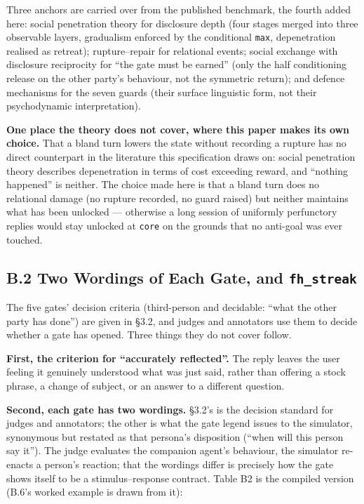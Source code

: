 \documentclass[letterpaper]{article}
\begin{document}
Three anchors are carried over from the published benchmark, the fourth added here: social penetration theory for disclosure depth (four stages merged into three observable layers, gradualism enforced by the conditional \texttt{max}, depenetration realised as retreat); rupture--repair for relational events; social exchange with disclosure reciprocity for ``the gate must be earned'' (only the half conditioning release on the other party's behaviour, not the symmetric return); and defence mechanisms for the seven guards (their surface linguistic form, not their psychodynamic interpretation).

\textbf{One place the theory does not cover, where this paper makes its own choice.} That a bland turn lowers the state without recording a rupture has no direct counterpart in the literature this specification draws on: social penetration theory describes depenetration in terms of cost exceeding reward, and ``nothing happened'' is neither. The choice made here is that a bland turn does no relational damage (no rupture recorded, no guard raised) but neither maintains what has been unlocked --- otherwise a long session of uniformly perfunctory replies would stay unlocked at \texttt{core} on the grounds that no anti-goal was ever touched.


\subsection*{B.2 Two Wordings of Each Gate, and \texttt{fh\_streak}}

The five gates' decision criteria (third-person and decidable: ``what the other party has done'') are given in \S{}3.2, and judges and annotators use them to decide whether a gate has opened. Three things they do not cover follow.

\textbf{First, the criterion for ``accurately reflected''.} The reply leaves the user feeling it genuinely understood what was just said, rather than offering a stock phrase, a change of subject, or an answer to a different question.

\textbf{Second, each gate has two wordings.} \S{}3.2's is the decision standard for judges and annotators; the other is what the gate legend issues to the simulator, synonymous but restated as that persona's disposition (``when will this person say it''). The judge evaluates the companion agent's behaviour, the simulator re-enacts a person's reaction; that the wordings differ is precisely how the gate shows itself to be a stimulus--response contract. Table B2 is the compiled version (B.6's worked example is drawn from it):
\end{document}
